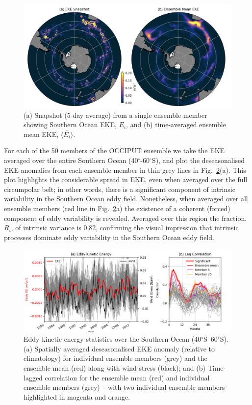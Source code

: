 \documentclass{agujournal2019}
\begin{document}
\begin{figure}[ht]
\begin{center}
\includegraphics[width=\hsize]{Figure1}
\caption{(a) Snapshot (5-day average) from a single ensemble member showing Southern Ocean EKE, $E_i$, and (b) time-averaged ensemble mean EKE, $\overline{\langle E_i\rangle}$.  }
\label{Fig:1}
\end{center}
\end{figure}

For each of the 50 members of the OCCIPUT ensemble we take the EKE averaged over the entire Southern Ocean (40$^\circ$-60$^\circ$S), and plot the deseasonalised EKE anomalies from each ensemble member in thin grey lines in Fig.~\ref{Fig:2}(a). 
This plot highlights the considerable spread in EKE, even when averaged over the full circumpolar belt; in other words, there is a significant component of intrinsic variability in the Southern Ocean eddy field.
Nonetheless, when averaged over all ensemble members (red line in Fig.~\ref{Fig:2}a) the existence of a coherent (forced) component of eddy variability is revealed.
Averaged over this region the fraction, $R_i$, of intrinsic variance is 0.82, confirming the visual impression that intrinsic processes dominate eddy variability in the Southern Ocean eddy field.

\begin{figure}[t]
\begin{center}
\includegraphics[width=\hsize]{Figure2}
\caption{Eddy kinetic energy statistics over the Southern Ocean (40$^\circ$S--60$^\circ$S). (a) Spatially averaged deseasonalised EKE anomaly (relative to climatology) for individual ensemble members (grey) and the ensemble mean (red) along with wind stress (black); and (b) Time-lagged correlation for the ensemble mean (red) and individual ensemble  members (grey) -- with two individual ensemble members highlighted in magenta and orange.}
\label{Fig:2}
\end{center}
\end{figure}
\end{document}
